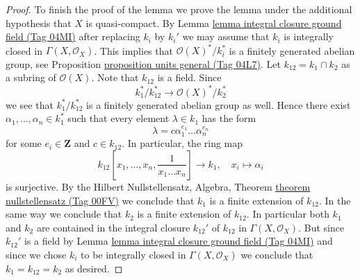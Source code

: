 \documentclass{amsart}
\theoremstyle{plain}
\theoremstyle{definition}
\theoremstyle{remark}
\numberwithin{equation}{subsection}
\begin{document}
\begin{proof}
\medskip\noindent
To finish the proof of the lemma we prove the lemma under the
additional hypothesis that $X$ is quasi-compact. By
Lemma \href{https://stacks.math.columbia.edu/tag/04MI}{lemma integral closure ground field (Tag 04MI)}
after replacing $k_i$ by $k_i'$
we may assume that $k_i$ is integrally closed in $\Gamma(X, \mathcal{O}_X)$.
This implies that $\mathcal{O}(X)^*/k_i^*$ is a finitely generated
abelian group, see
Proposition \href{https://stacks.math.columbia.edu/tag/04L7}{proposition units general (Tag 04L7)}.
Let $k_{12} = k_1 \cap k_2$ as a subring of $\mathcal{O}(X)$.
Note that $k_{12}$ is a field. Since
$$
k_1^*/k_{12}^* \longrightarrow \mathcal{O}(X)^*/k_2^*
$$
we see that $k_1^*/k_{12}^*$ is a finitely generated abelian group as well.
Hence there exist $\alpha_1, \ldots, \alpha_n \in k_1^*$ such that
every element $\lambda \in k_1$ has the form
$$
\lambda = c \alpha_1^{e_1} \ldots \alpha_n^{e_n}
$$
for some $e_i \in \mathbf{Z}$ and $c \in k_{12}$.
In particular, the ring map
$$
k_{12}[x_1, \ldots, x_n, \frac{1}{x_1 \ldots x_n}] \longrightarrow k_1, \quad
x_i \longmapsto \alpha_i
$$
is surjective. By the Hilbert Nullstellensatz,
Algebra, Theorem \href{https://stacks.math.columbia.edu/tag/00FV}{theorem nullstellensatz (Tag 00FV)}
we conclude that $k_1$ is a finite extension of $k_{12}$.
In the same way we conclude that $k_2$ is a finite extension of $k_{12}$.
In particular both $k_1$ and $k_2$ are contained in the integral closure
$k_{12}'$ of $k_{12}$ in $\Gamma(X, \mathcal{O}_X)$. But since $k_{12}'$
is a field by
Lemma \href{https://stacks.math.columbia.edu/tag/04MI}{lemma integral closure ground field (Tag 04MI)}
and since we chose $k_i$ to be integrally closed in $\Gamma(X, \mathcal{O}_X)$
we conclude that $k_1 = k_{12} = k_2$ as desired.
\end{proof}
\end{document}
